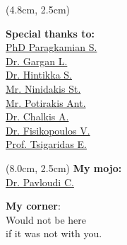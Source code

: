 \documentclass{beamer}
\begin{document}
\begin{darkframes}
\begin{frame}


      \begin{textblock*}{4.0cm}(4.8cm, 2.5cm)

         \footnotesize \textbf{Special thanks to:} \\

         \footnotesize \href{https://imbbc.hcmr.gr/user/s-paragkamian/}{PhD Paragkamian S.} \\
         \footnotesize \href{https://sites.google.com/view/lab-area52/home/meet-the-team?authuser=0}{Dr. Gargan L.} \\
         \footnotesize \href{https://www.researchgate.net/profile/Sanni-Hintikka}{Dr. Hintikka S.} \\
         \footnotesize \href{https://imbbc.hcmr.gr/user/sninidakis/}{Mr. Ninidakis St.} \\
         \footnotesize \href{https://imbbc.hcmr.gr/user/potant/}{Mr. Potirakis Ant.} \\
         \footnotesize \href{https://tolischal.github.io/}{Dr. Chalkis A.} \\
         \footnotesize \href{https://vissarion.github.io/}{Dr. Fisikopoulos V.} \\ 
         \footnotesize \href{https://who.paris.inria.fr/Elias.Tsigaridas/}{Prof. Tsigaridas E.} \\
         
      \end{textblock*}

      \begin{textblock*}{4.0cm}(8.0cm, 2.5cm)
         \footnotesize
         \textbf{My mojo:}\\
         \footnotesize 
         \href{https://cpavloud.github.io/mysite/projects/}{Dr. Pavloudi C.} \\ 

         \bigskip 

         \textbf{My corner}: \\

            Would not be here \\
            if it was not with you. 
         
      \end{textblock*}



\end{frame}
\end{darkframes}
\end{document}
